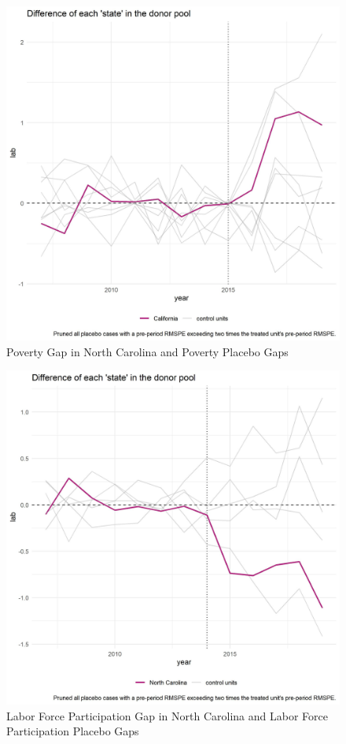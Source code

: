 \documentclass{article}
\begin{document}
 \begin{figure}[H]
    \caption{Poverty Gap in North Carolina and Poverty Placebo Gaps}
    \begin{center}
        \includegraphics[width=.85\textwidth]{ca_lab_placebos}
    \end{center}
    \label{fig:ca_lab_placebos}{}
\end{figure}

 \begin{figure}[H]
    \caption{Labor Force Participation Gap in North Carolina and Labor Force Participation Placebo Gaps}
    \begin{center}
        \includegraphics[width=.85\textwidth]{nc_lab_placebos}
    \end{center}
    \label{fig:nc_lab_placebos}{}
\end{figure}
\end{document}

